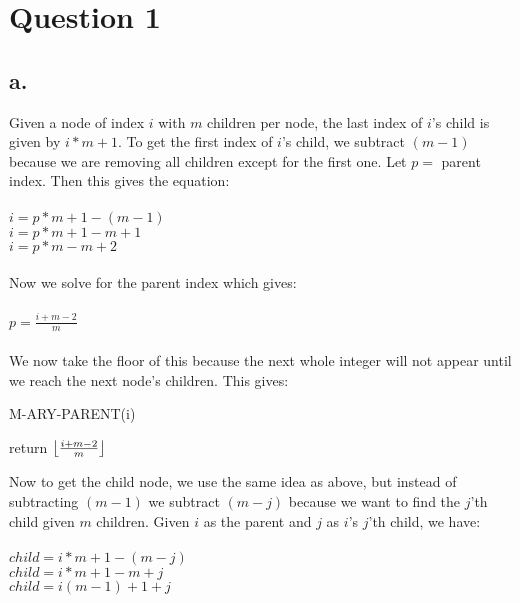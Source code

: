 \documentclass[12pt]{article}
\DeclarePairedDelimiter\floor{\lfloor}{\rfloor}
\begin{document}

\pagestyle{fancy}

\vspace{5mm} %

\section{Question 1}

\subsection{a.}

Given a node of index $i$ with $m$ children per node, the last index of $i$'s child is given by $i*m + 1$. To get the first index of $i$'s child, we subtract $(m-1)$ because we are removing all children except for the first one. Let $p = $ parent index. Then this gives the equation:\\
 \\$i = p*m + 1 - (m - 1)$
 \\$i = p*m + 1 - m + 1$
 \\$i = p*m - m + 2$ \\
 \\Now we solve for the parent index which gives: \\
 \\$p ={\frac{i + m - 2}{m} }$ \\ \\
 We now take the floor of this because the next whole integer will not appear until we reach the next node's children. This gives: 
 
 \begin{algorithm}
\caption{M-ARY-PARENT(i)}
\begin{algorithmic} 
\STATE return  $\floor*{\frac{i + m - 2}{m} }$
\end{algorithmic}
\end{algorithm}

Now to get the child node, we use the same idea as above, but instead of subtracting $(m-1)$  we subtract $(m-j)$ because we want to find the $j$'th child given $m$ children. Given $i$ as the parent and $j$ as $i$'s $j$'th child, we have: \\ \\
$child = i*m + 1 - (m - j)$ \\
$child = i*m + 1 - m + j$ \\
$child = i(m-1) + 1 + j$ 
\end{document}
